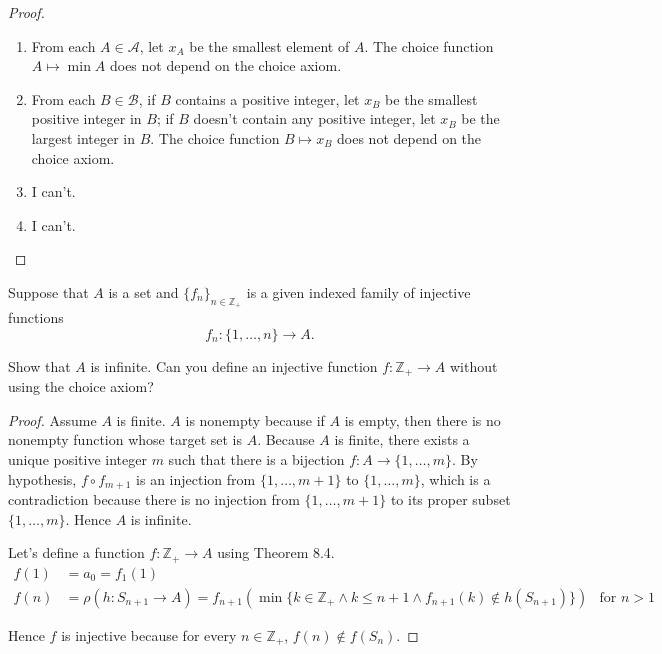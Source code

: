 \begin{proof}
    \begin{enumerate}[label={(\alph*)}]
        \item From each $A\in\mathscr{A}$, let $x_{A}$ be the smallest element of $A$. The choice function $A\mapsto \min A$ does not depend on the choice axiom.
        \item From each $B\in\mathscr{B}$, if $B$ contains a positive integer, let $x_{B}$ be the smallest positive integer in $B$; if $B$ doesn't contain any positive integer, let $x_{B}$ be the largest integer in $B$. The choice function $B\mapsto x_{B}$ does not depend on the choice axiom.
        \item I can't.
        \item I can't.
    \end{enumerate}
\end{proof}

\begin{exercise}\label{chapter1:section9:exercise3}
    Suppose that $A$ is a set and ${\{ f_{n} \}}_{n\in\mathbb{Z}_{+}}$ is a given indexed family of injective functions
    \[
        f_{n}: \{ 1, \ldots, n \} \to A.
    \]

    Show that $A$ is infinite. Can you define an injective function $f: \mathbb{Z}_{+}\to A$ without using the choice axiom?
\end{exercise}

\begin{proof}
    Assume $A$ is finite. $A$ is nonempty because if $A$ is empty, then there is no nonempty function whose target set is $A$. Because $A$ is finite, there exists a unique positive integer $m$ such that there is a bijection $f: A\to \{ 1,\ldots, m \}$. By hypothesis, $f\circ f_{m+1}$ is an injection from $\{ 1, \ldots, m+1 \}$ to $\{ 1,\ldots, m \}$, which is a contradiction because there is no injection from $\{ 1, \ldots, m+1 \}$ to its proper subset $\{ 1,\ldots,m \}$. Hence $A$ is infinite.

    Let's define a function $f: \mathbb{Z}_{+}\to A$ using Theorem 8.4.
    \begin{align*}
        f(1) & = a_{0} = f_{1}(1)                                                                                                                      \\
        f(n) & = \rho(h: S_{n+1}\to A) = f_{n+1}(\min\{ k\in \mathbb{Z}_{+} \land k\leq n+1 \land f_{n+1}(k)\notin h(S_{n+1}) \}) & \text{for $n > 1$}
    \end{align*}

    Hence $f$ is injective because for every $n\in\mathbb{Z}_{+}$, $f(n)\notin f(S_{n})$.
\end{proof}

